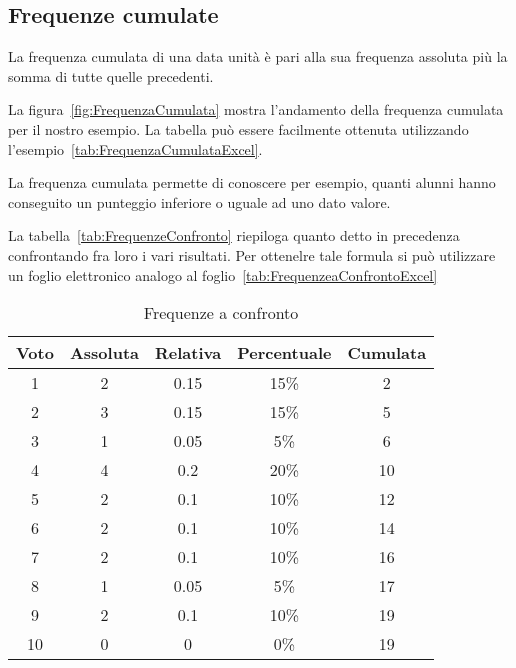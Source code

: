 \subsection{Frequenze cumulate}
\begin{definizione}
	La frequenza cumulata di una data unità è pari alla sua frequenza assoluta più la somma di tutte quelle precedenti.
\end{definizione}
La figura~\vref*{fig:FrequenzaCumulata} mostra l'andamento della frequenza cumulata per il nostro esempio. La tabella può essere facilmente ottenuta utilizzando l'esempio~\vref{tab:FrequenzaCumulataExcel}.

La frequenza cumulata permette di conoscere per esempio, quanti alunni hanno conseguito un punteggio inferiore o uguale ad uno dato valore.

La tabella~\vref{tab:FrequenzeConfronto} riepiloga quanto detto in precedenza confrontando fra loro i vari risultati. Per ottenelre tale formula si può utilizzare un foglio elettronico analogo al foglio~\vref{tab:FrequenzeaConfrontoExcel}
\begin{table}[!t]
	\centering
 	 \begin{tabular} {*{2} {S[table-format=1.0]}S[table-format=1.2]*{2} {S[table-format=2.0]} }%
 	 	\toprule
 	 	{Voto}  & {Assoluta} & {Relativa} & {Percentuale} &{Cumulata} \\
 	 		& 2 & 0.15 & 15\% & 2  \\ 
 	 	2	& 3 & 0.15 & 15\% & 5 \\ 
 	 	3	& 1 & 0.05 & 5\% & 6 \\ 
 	 	4	& 4 & 0.2 & 20\% & 10 \\ 
 	 	5	& 2 & 0.1 & 10\% & 12 \\ 
 	 	6 	& 2 & 0.1 & 10\% & 14 \\ 
 	 	7	& 2 & 0.1 & 10\% & 16 \\ 
 	 	8	& 1 & 0.05 & 5\% & 17 \\ 
 	 	9	& 2 & 0.1 & 10\% & 19 \\ 
 	 	10	& 0 & 0 & 0\% & 19 \\ 
 	 	\bottomrule
 	 \end{tabular}
 	\caption{Frequenze a confronto}
 	\label{tab:FrequenzeConfronto}
 \end{table}
 
 
